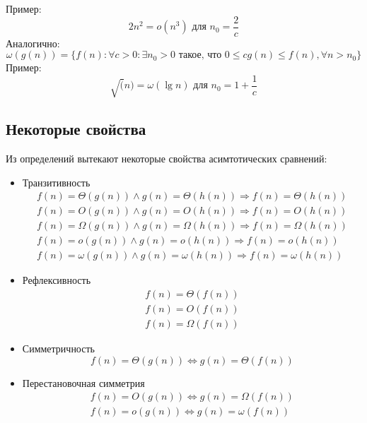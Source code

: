 \documentclass[a4paper,11pt]{article}
\begin{document}
Пример:
\begin{equation*}
  2n^2 = o(n^3) \text{ для } n_0 = \frac{2}{c}
\end{equation*}
Аналогично:
\begin{equation*}
  \omega(g(n)) = \{f(n): \forall c > 0: \exists n_0 > 0 \text{ такое, что }
  0 \leqslant c g(n) \leqslant f(n), \forall n > n_0
  \}
\end{equation*}
Пример:
\begin{equation*}
  \sqrt(n) = \omega(\lg n) \text{ для } n_0 = 1 + \frac{1}{c}
\end{equation*}

\subsection{Некоторые свойства}

Из определений вытекают некоторые свойства асимтотических сравнений:

\begin{itemize}
\item Транзитивность
\begin{align*}
  f(n) = \Theta(g(n)) \land g(n) = \Theta(h(n)) \Rightarrow f(n) = \Theta(h(n)) \\
  f(n) = O(g(n)) \land g(n) = O(h(n)) \Rightarrow f(n) = O(h(n)) \\
  f(n) = \Omega(g(n)) \land g(n) = \Omega(h(n)) \Rightarrow f(n) = \Omega(h(n)) \\
  f(n) = o(g(n)) \land g(n) = o(h(n)) \Rightarrow f(n) = o(h(n)) \\
  f(n) = \omega(g(n)) \land g(n) = \omega(h(n)) \Rightarrow f(n) = \omega(h(n))
\end{align*}

\item Рефлексивность
\begin{align*}
  f(n) = \Theta(f(n)) \\
  f(n) = O(f(n)) \\
  f(n) = \Omega(f(n))
\end{align*}

\item Симметричность
\begin{equation*}
  f(n) = \Theta(g(n)) \iff g(n) = \Theta(f(n))
\end{equation*}

\item Перестановочная симметрия
\begin{align*}
  f(n) = O(g(n)) \iff g(n) = \Omega(f(n)) \\
  f(n) = o(g(n)) \iff g(n) = \omega(f(n))
\end{align*}
\end{itemize}
\end{document}
